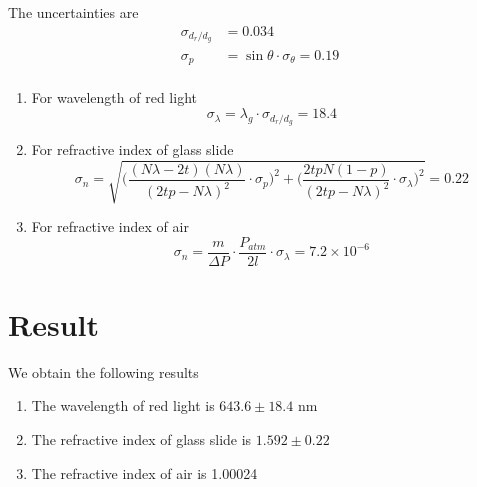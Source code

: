 \documentclass[12pt]{article}
\begin{document}
\noindent The uncertainties are
\begin{align*}
    \sigma_{d_r/d_g} &= 0.034\\
    \sigma_p &= \sin\theta\cdot\sigma_\theta = 0.19
\end{align*}
\begin{align*}
\end{align*}
\begin{enumerate}
    \item For wavelength of red light
    \[\sigma_\lambda = \lambda_g\cdot\sigma_{d_r/d_g} = 18.4\]
    \item For refractive index of glass slide
    \[\sigma_n=\sqrt{\bigg(\frac{(N\lambda -2t)(N\lambda)}{(2tp-N\lambda)^2}\cdot\sigma_p \bigg)^2 + \bigg(\frac{2tpN(1-p)}{(2tp-N\lambda)^2}\cdot\sigma_\lambda\bigg)^2} = 0.22\]
    \item For refractive index of air
    \[\sigma_n =\frac{m}{\Delta P}\cdot \frac{P_{atm}}{2l}\cdot\sigma_\lambda = 7.2\times 10^{-6}\]
\end{enumerate}
\section*{Result}
We obtain the following results
\begin{enumerate}
    \item The wavelength of red light is $643.6\pm 18.4$ nm
    \item The refractive index of glass slide is $1.592\pm 0.22$
    \item The refractive index of air is 1.00024
\end{enumerate}
\end{document}
